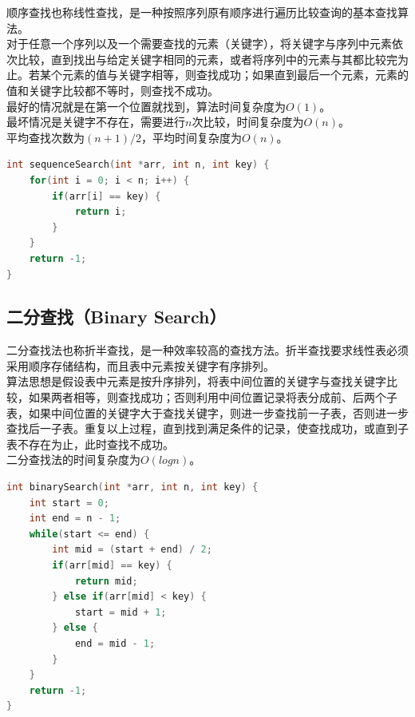 顺序查找也称线性查找，是一种按照序列原有顺序进行遍历比较查询的基本查找算法。 \\

对于任意一个序列以及一个需要查找的元素（关键字），将关键字与序列中元素依次比较，直到找出与给定关键字相同的元素，或者将序列中的元素与其都比较完为止。若某个元素的值与关键字相等，则查找成功；如果直到最后一个元素，元素的值和关键字比较都不等时，则查找不成功。 \\

最好的情况就是在第一个位置就找到，算法时间复杂度为$ O(1) $。 \\

最坏情况是关键字不存在，需要进行$ n $次比较，时间复杂度为$ O(n) $。 \\

平均查找次数为$ (n + 1) / 2 $，平均时间复杂度为$ O(n) $。 \\


\begin{lstlisting}[language=C]
int sequenceSearch(int *arr, int n, int key) {
    for(int i = 0; i < n; i++) {
        if(arr[i] == key) {
            return i;
        }
    }
    return -1;
}
\end{lstlisting}

\subsection{二分查找（Binary Search）}

二分查找法也称折半查找，是一种效率较高的查找方法。折半查找要求线性表必须采用顺序存储结构，而且表中元素按关键字有序排列。 \\

算法思想是假设表中元素是按升序排列，将表中间位置的关键字与查找关键字比较，如果两者相等，则查找成功；否则利用中间位置记录将表分成前、后两个子表，如果中间位置的关键字大于查找关键字，则进一步查找前一子表，否则进一步查找后一子表。重复以上过程，直到找到满足条件的记录，使查找成功，或直到子表不存在为止，此时查找不成功。 \\

二分查找法的时间复杂度为$ O(logn) $。 \\


\begin{lstlisting}[language=C]
int binarySearch(int *arr, int n, int key) {
    int start = 0;
    int end = n - 1;
    while(start <= end) {
        int mid = (start + end) / 2;
        if(arr[mid] == key) {
            return mid;
        } else if(arr[mid] < key) {
            start = mid + 1;
        } else {
            end = mid - 1;
        }
    }
    return -1;
}
\end{lstlisting}

